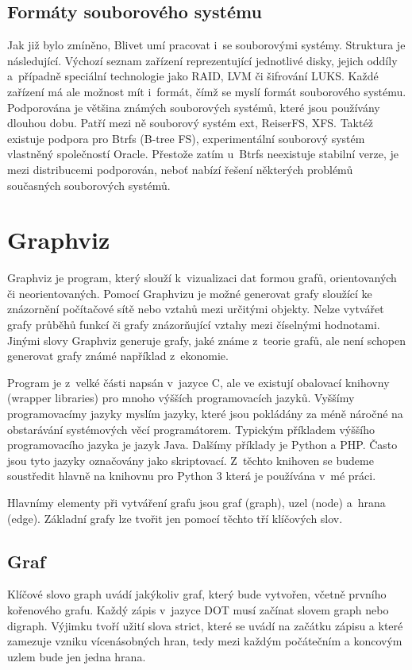 \documentclass[color,table,oneside,nolot,nolof]{fithesis}
\begin{document}
\subsection{Formáty souborového systému}
  Jak již bylo zmíněno, Blivet umí pracovat i~se souborovými systémy. Struktura je následující. Výchozí seznam zařízení reprezentující jednotlivé disky, jejich oddíly a~případně
	speciální technologie jako RAID, LVM či šifrování LUKS. Každé zařízení má ale možnost mít i~formát, čímž se myslí formát souborového systému. Podporována je většina známých 
	souborových
	systémů, které jsou používány dlouhou dobu. Patří mezi ně souborový systém ext, ReiserFS, XFS. Taktéž existuje podpora pro Btrfs (B-tree FS), experimentální souborový systém 
	vlastněný společností Oracle. Přestože zatím u~Btrfs neexistuje stabilní verze, je mezi distribucemi podporován, neboť nabízí řešení některých problémů současných souborových systémů.

\section{Graphviz}
	Graphviz je program, který slouží k~vizualizaci dat formou grafů, orientovaných či neorientovaných. Pomocí Graphvizu je možné generovat grafy sloužící ke znázornění počítačové sítě nebo
	vztahů mezi určitými objekty. Nelze vytvářet grafy průběhů funkcí či grafy znázorňující vztahy mezi číselnými hodnotami. Jinými slovy Graphviz generuje grafy, jaké známe z~teorie grafů,
	ale není schopen generovat grafy známé například z~ekonomie.

	Program je z~velké části napsán v~jazyce C, ale ve existují obalovací knihovny (wrapper libraries) pro mnoho výšších programovacích jazyků. Vyššímy 
	programovacímy jazyky myslím jazyky, které jsou pokládány za méně náročné na obstarávání systémových věcí programátorem. Typickým příkladem výššího 
	programovacího jazyka je jazyk Java. Dalšímy příklady je Python a PHP. Často jsou tyto jazyky označovány jako skriptovací. 
	Z~těchto knihoven se budeme soustředit hlavně na knihovnu pro Python 3 která je používána v~mé práci.

	Hlavnímy elementy při vytváření grafu jsou graf (graph), uzel (node) a~hrana (edge). Základní grafy lze tvořit jen pomocí těchto tří klíčových slov.

\subsection{Graf}
	Klíčové slovo graph uvádí jakýkoliv graf, který bude vytvořen, včetně prvního kořenového grafu. Každý zápis v~jazyce DOT musí začínat slovem graph nebo digraph. Výjimku tvoří užití slova
	strict, které se uvádí na začátku zápisu a které zamezuje vzniku vícenásobných hran, tedy mezi každým počátečním a koncovým uzlem bude jen jedna hrana. 
\end{document}
